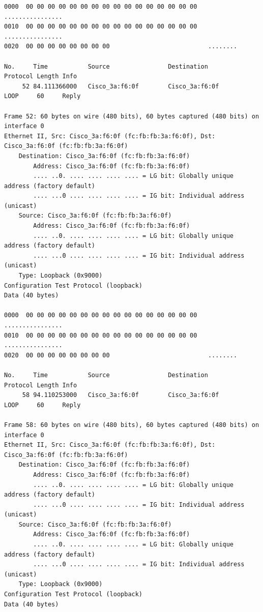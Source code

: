 \documentclass[a4paper,11pt]{article}
\begin{document}
\begin{lstlisting}
0000  00 00 00 00 00 00 00 00 00 00 00 00 00 00 00 00   ................
0010  00 00 00 00 00 00 00 00 00 00 00 00 00 00 00 00   ................
0020  00 00 00 00 00 00 00 00                           ........

No.     Time           Source                Destination           Protocol Length Info
     52 84.111366000   Cisco_3a:f6:0f        Cisco_3a:f6:0f        LOOP     60     Reply

Frame 52: 60 bytes on wire (480 bits), 60 bytes captured (480 bits) on interface 0
Ethernet II, Src: Cisco_3a:f6:0f (fc:fb:fb:3a:f6:0f), Dst: Cisco_3a:f6:0f (fc:fb:fb:3a:f6:0f)
    Destination: Cisco_3a:f6:0f (fc:fb:fb:3a:f6:0f)
        Address: Cisco_3a:f6:0f (fc:fb:fb:3a:f6:0f)
        .... ..0. .... .... .... .... = LG bit: Globally unique address (factory default)
        .... ...0 .... .... .... .... = IG bit: Individual address (unicast)
    Source: Cisco_3a:f6:0f (fc:fb:fb:3a:f6:0f)
        Address: Cisco_3a:f6:0f (fc:fb:fb:3a:f6:0f)
        .... ..0. .... .... .... .... = LG bit: Globally unique address (factory default)
        .... ...0 .... .... .... .... = IG bit: Individual address (unicast)
    Type: Loopback (0x9000)
Configuration Test Protocol (loopback)
Data (40 bytes)

0000  00 00 00 00 00 00 00 00 00 00 00 00 00 00 00 00   ................
0010  00 00 00 00 00 00 00 00 00 00 00 00 00 00 00 00   ................
0020  00 00 00 00 00 00 00 00                           ........

No.     Time           Source                Destination           Protocol Length Info
     58 94.110253000   Cisco_3a:f6:0f        Cisco_3a:f6:0f        LOOP     60     Reply

Frame 58: 60 bytes on wire (480 bits), 60 bytes captured (480 bits) on interface 0
Ethernet II, Src: Cisco_3a:f6:0f (fc:fb:fb:3a:f6:0f), Dst: Cisco_3a:f6:0f (fc:fb:fb:3a:f6:0f)
    Destination: Cisco_3a:f6:0f (fc:fb:fb:3a:f6:0f)
        Address: Cisco_3a:f6:0f (fc:fb:fb:3a:f6:0f)
        .... ..0. .... .... .... .... = LG bit: Globally unique address (factory default)
        .... ...0 .... .... .... .... = IG bit: Individual address (unicast)
    Source: Cisco_3a:f6:0f (fc:fb:fb:3a:f6:0f)
        Address: Cisco_3a:f6:0f (fc:fb:fb:3a:f6:0f)
        .... ..0. .... .... .... .... = LG bit: Globally unique address (factory default)
        .... ...0 .... .... .... .... = IG bit: Individual address (unicast)
    Type: Loopback (0x9000)
Configuration Test Protocol (loopback)
Data (40 bytes)


\end{lstlisting}
\end{document}
